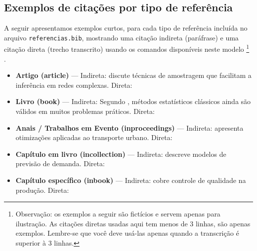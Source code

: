 \subsection{Exemplos de citações por tipo de referência}

A seguir apresentamos exemplos curtos, para cada tipo de referência incluída no arquivo
\texttt{referencias.bib}, mostrando uma citação indireta (paráfrase) e uma citação direta (trecho
transcrito) usando os comandos disponíveis neste modelo%
\footnote{Observação: os exemplos a seguir são fictícios e servem apenas para ilustração. As
    citações diretas usadas aqui tem menos de 3 linhas, são apenas exemplos. Lembre-se que você deve
    usá-las apenas quando a transcrição é superior à 3 linhas.}%
.

\begin{itemize}
    \item \textbf{Artigo (article)} --- Indireta: \textcite{article1} discute técnicas de amostragem que facilitam a inferência em redes complexas. Direta:\par

    \item \textbf{Livro (book)} --- Indireta: Segundo \textcite{book1}, métodos estatísticos clássicos ainda são válidos em muitos problemas práticos. Direta:\par

    \item \textbf{Anais / Trabalhos em Evento (inproceedings)} --- Indireta: \textcite{inproceedings1} apresenta otimizações aplicadas ao transporte urbano. Direta:\par

    \item \textbf{Capítulo em livro (incollection)} --- Indireta: \textcite{incollection1} descreve modelos de previsão de demanda. Direta:\par

    \item \textbf{Capítulo específico (inbook)} --- Indireta: \textcite{inbook1} cobre controle de qualidade na produção. Direta:\par


\end{itemize}
